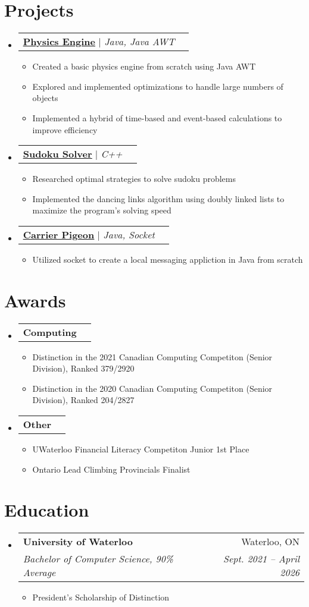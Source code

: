 \documentclass[letterpaper,11pt]{article}
\makeatletter
\newcommand{\resumeItem}[1]{
	\item\small{
		{#1 \vspace{-2pt}}
	}
}
\newcommand{\resumeSubheading}[4]{
	\vspace{-2pt}\item
		\begin{tabular*}{0.97\textwidth}[t]{l@{\extracolsep{\fill}}r}
			\textbf{#1} & #2 \\
			\textit{\small#3} & \textit{\small #4} \\
		\end{tabular*}\vspace{-7pt}
}
\newcommand{\resumeProjectHeading}[2]{
    \item
    \begin{tabular*}{0.97\textwidth}{l@{\extracolsep{\fill}}r}
      \small#1 & #2 \\
    \end{tabular*}\vspace{-7pt}
}
\newcommand{\resumeSubHeadingListStart}{\begin{itemize}[leftmargin=0.15in, label={}]}
\newcommand{\resumeSubHeadingListEnd}{\end{itemize}}
\newcommand{\resumeItemListStart}{\begin{itemize}}
\newcommand{\resumeItemListEnd}{\end{itemize}\vspace{-5pt}}
\makeatother
\begin{document}
\section{Projects}
\resumeSubHeadingListStart
	\resumeProjectHeading
	{\textbf{\href{https://github.com/Bro-Co/Physics-Engine}{\underline{Physics Engine}}} $|$ \emph{Java, Java AWT}}{} \resumeItemListStart
			\resumeItem{Created a basic physics engine from scratch using Java AWT}
			\resumeItem{Explored and implemented optimizations to handle large numbers of objects}
			\resumeItem{Implemented a hybrid of time-based and event-based calculations to improve efficiency}
		\resumeItemListEnd
	\resumeProjectHeading
		{\textbf{\href{https://github.com/smchase/ICS201/tree/master/SUDOKU}{\underline{Sudoku Solver}}} $|$ \emph{C++}}{}
		\resumeItemListStart
			\resumeItem{Researched optimal strategies to solve sudoku problems}
			\resumeItem{Implemented the dancing links algorithm using doubly linked lists to maximize the program's solving speed}
		\resumeItemListEnd
	\resumeProjectHeading
		{\textbf{\href{https://github.com/smchase/Carrier-Pigeon}{\underline{Carrier Pigeon}}} $|$ \emph{Java, Socket}}{}
		\resumeItemListStart
			\resumeItem{Utilized socket to create a local messaging appliction in Java from scratch}
		\resumeItemListEnd
\resumeSubHeadingListEnd


\section{Awards}
\resumeSubHeadingListStart
	\resumeProjectHeading
		{\textbf{Computing}}{}
		\resumeItemListStart
			\resumeItem{Distinction in the 2021 Canadian Computing Competiton (Senior Division), Ranked 379/2920}
			\resumeItem{Distinction in the 2020 Canadian Computing Competiton (Senior Division), Ranked 204/2827}
		\resumeItemListEnd
	\resumeProjectHeading
		{\textbf{Other}}{}
		\resumeItemListStart
			\resumeItem{UWaterloo Financial Literacy Competiton Junior 1st Place}
			\resumeItem{Ontario Lead Climbing Provincials Finalist}
		\resumeItemListEnd
\resumeSubHeadingListEnd


\section{Education}
\resumeSubHeadingListStart
	\resumeSubheading
		{University of Waterloo}{Waterloo, ON}
		{Bachelor of Computer Science, 90\% Average}{Sept. 2021 -- April 2026}
	\resumeItemListStart
		\resumeItem{President's Scholarship of Distinction}
	\resumeItemListEnd
\resumeSubHeadingListEnd
\end{document}

